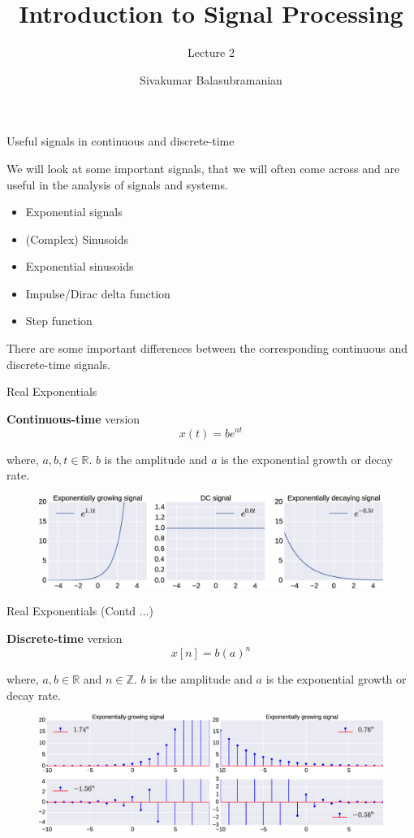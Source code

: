 \documentclass{beamer}
\title{Introduction to Signal Processing}
\subtitle{Lecture 2}
\author{Sivakumar Balasubramanian}
\institute[Christian Medical College] %
{
  \inst{}%
  Department of Bioengineering\\
  Christian Medical College, Bagayam\\
  Vellore 632002
}
\date{}
\begin{document}
\begin{frame}
  \titlepage
\end{frame}

\begin{frame}{Useful signals in continuous and discrete-time}

We will look at some important signals, that we will often come across and are useful in the analysis of signals and systems.
\begin{itemize}
\item Exponential signals
\item (Complex) Sinusoids
\item Exponential sinusoids
\item Impulse/Dirac delta function
\item Step function
\end{itemize}

There are some important differences between the corresponding continuous and discrete-time signals.

\end{frame}

\begin{frame}{Real Exponentials}

\textbf{Continuous-time} version
\[ x(t) = be^{at} \]

where, $a, b, t \in \mathbb{R}$. $b$ is the amplitude and $a$ is the exponential growth or decay rate.

\begin{figure}
\includegraphics[width=\textwidth]{img/exp.eps}
\end{figure}
\end{frame}

\begin{frame}{Real Exponentials (Contd ...)}

\textbf{Discrete-time} version
\[ x[n] =  b \left(a\right)^n \]

where, $a, b \in \mathbb{R}$ and $n \in \mathbb{Z}$. $b$ is the amplitude and $a$ is the exponential growth or decay rate.

\begin{figure}
\includegraphics[width=\textwidth]{img/disc_exp.eps}
\end{figure}
\end{frame}
\end{document}

